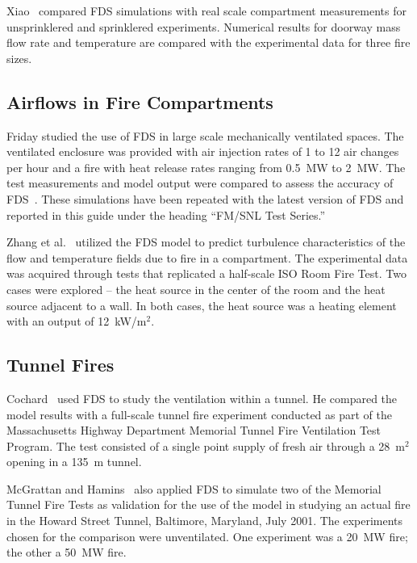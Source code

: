 Xiao~\cite{Xiao:FT2012} compared FDS simulations with real scale compartment measurements for unsprinklered and sprinklered experiments. Numerical results for doorway mass flow rate and temperature are compared with the experimental data for three fire sizes.



\subsection{Airflows in Fire Compartments}

Friday studied the use of FDS in large scale mechanically ventilated spaces.  The ventilated enclosure was provided with air injection rates of 1 to 12 air changes per hour and a fire with heat release rates ranging from 0.5~MW to 2~MW. The test measurements and model output were compared to assess the accuracy of FDS~\cite{Friday:1}. These simulations have been repeated with the latest version of FDS and reported in this guide under
the heading ``FM/SNL Test Series.''

Zhang et al.~\cite{Zhang:2} utilized the FDS model to predict turbulence characteristics of the flow and temperature fields due to fire in a compartment.  The experimental data was acquired through tests that replicated a half-scale ISO Room Fire Test. Two cases were explored -- the heat source in the center of the room and the heat source adjacent to a wall. In both cases, the heat source was a heating element with an output of 12~kW/m$^2$.


\subsection{Tunnel Fires}

Cochard~\cite{Cochard:1} used FDS to study the ventilation within a tunnel. He compared the model results with a full-scale tunnel fire experiment conducted as part of the Massachusetts Highway Department Memorial Tunnel Fire Ventilation Test Program. The test consisted of a single point supply of fresh air through a 28~m$^2$ opening in a 135~m tunnel.

McGrattan and Hamins~\cite{McGrattan:HST} also applied FDS to simulate two of the Memorial Tunnel Fire Tests as validation for the use of the model in studying an actual fire in the Howard Street Tunnel, Baltimore, Maryland, July 2001. The experiments chosen for the comparison were unventilated. One experiment was a 20~MW fire; the other a 50~MW fire.

